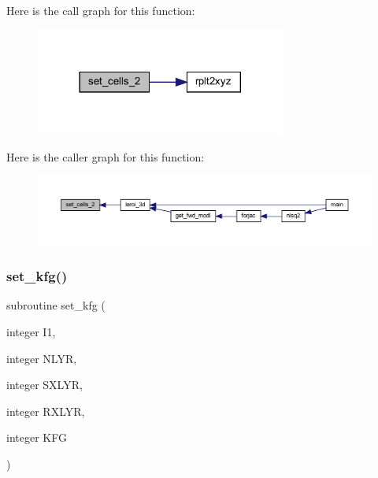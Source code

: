 Here is the call graph for this function\+:\nopagebreak
\begin{figure}[H]
\begin{center}
\leavevmode
\includegraphics[width=233pt]{Leroi_8f90_a14cc0157cbf2d5d8c0af6167028061cf_cgraph}
\end{center}
\end{figure}
Here is the caller graph for this function\+:\nopagebreak
\begin{figure}[H]
\begin{center}
\leavevmode
\includegraphics[width=350pt]{Leroi_8f90_a14cc0157cbf2d5d8c0af6167028061cf_icgraph}
\end{center}
\end{figure}
\mbox{\label{Leroi_8f90_a8e7ce2c7dc3e5ee45a8adefc6e6bba97}} 
\subsubsection{\texorpdfstring{set\+\_\+kfg()}{set\_kfg()}}
{\footnotesize\ttfamily subroutine set\+\_\+kfg (\begin{DoxyParamCaption}\item[{integer}]{I1,  }\item[{integer}]{N\+L\+YR,  }\item[{integer}]{S\+X\+L\+YR,  }\item[{integer}]{R\+X\+L\+YR,  }\item[{integer}]{K\+FG }\end{DoxyParamCaption})}


